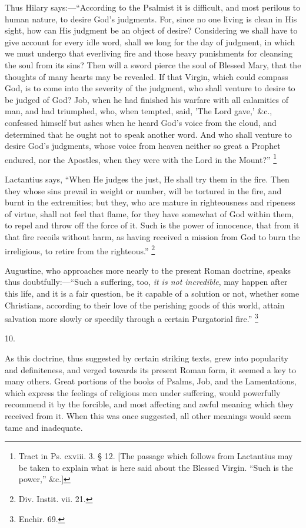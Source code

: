 Thus Hilary says:—``According to the Psalmist it is difficult,
and most perilous to human nature, to desire God's judgments. For,
since no one living is clean in His sight, how can His judgment be an
object of desire? Considering we shall have to give account for every
idle word, shall we long for the day of judgment, in which we must
undergo that everliving fire and those heavy punishments for
cleansing the soul from its sins? Then will a sword pierce the soul of
Blessed Mary, that the thoughts of many hearts may be revealed. If
that Virgin, which could compass God, is to come into the severity of
the judgment, who shall venture to desire to be judged of God? Job,
when he had finished his warfare with all calamities of man, and had
triumphed, who, when tempted, said, 'The Lord gave,' \&c.,
confessed himself but ashes when he heard God's voice from the cloud,
and determined that he ought not to speak another word. And who shall
venture to desire God's judgments, whose voice from heaven neither so
great a Prophet endured, nor the Apostles, when they were with the
Lord in the Mount?'' \footnote{Tract in Ps. cxviii. 3. § 12. [The
passage which follows from Lactantius may be taken to explain what is
here said about the Blessed Virgin. ``Such is the power,''
\&c.]}

Lactantius says, ``When He judges the just, He shall try them
in the fire. Then they whose sins prevail in weight or number, will be
tortured in the fire, and burnt in the extremities; but they, who are
mature in righteousness and ripeness of virtue, shall not feel that
flame, for they have somewhat of God within them, to repel and throw
off the force of it. Such is the power of innocence, that from it that
fire recoils without harm, as having received a mission from God to
burn the irreligious, to retire from the righteous.'' \footnote{Div. Instit. vii. 21.}

Augustine, who approaches more nearly to the present Roman
doctrine, speaks thus doubtfully:—``Such a suffering, too, \emph{it
is not incredible}, may happen after this life, and it is a fair
question, be it capable of a solution or not, whether some Christians,
according to their love of the perishing goods of this world, attain
salvation more slowly or speedily through a certain Purgatorial
fire.'' \footnote{Enchir. 69.}

10.

As this doctrine, thus suggested by certain striking texts, grew
into popularity and definiteness, and verged towards its present Roman
form, it seemed a key to many others. Great portions of the books of
Psalms, Job, and the Lamentations, which express the feelings of
religious men under suffering, would powerfully recommend it by the
forcible, and most affecting and awful meaning which they received
from it. When this was once suggested, all other meanings would seem
tame and inadequate.

